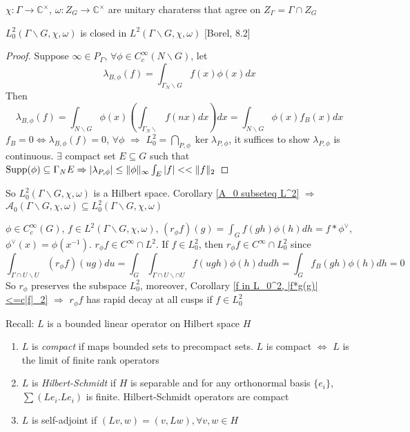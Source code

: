 \documentclass[../main.tex]{subfiles}
\begin{document}
$\chi:\Gamma\to\mathbb C^\times$, $\omega:Z_G\to\mathbb C^\times$ are unitary charaterss that agree on $Z_\Gamma=\Gamma\cap Z_G$

\begin{proposition}
$L_0^2(\Gamma\backslash G,\chi,\omega)$ is closed in $L^2(\Gamma\backslash G,\chi,\omega)$ [Borel, 8.2]
\end{proposition}

\begin{proof}
Suppose $\infty\in P_\Gamma$, $\forall \phi\in C_c^\infty(N\backslash G)$, let
\[\lambda_{B,\phi}(f)=\int_{\Gamma_N\backslash G}f(x)\phi(x)dx\]
Then
\[\lambda_{B,\phi}(f)=\int_{N\backslash G}\phi(x)\left(\int_{\Gamma_N\backslash} f(nx)dx\right)dx=\int_{N\backslash G}\phi(x)f_B(x)dx\]
$f_B=0\iff\lambda_{B,\phi}(f)=0$, $\forall\phi$ $\Rightarrow$ $L_0^2=\bigcap_{P,\phi}\ker\lambda_{P,\phi}$, it suffices to show $\lambda_{P,\phi}$ is continuous. $\exists$ compact set $E\subseteq G$ such that $\operatorname{Supp}(\phi)\subseteq\Gamma_NE\Rightarrow |\lambda_{P,\phi}|\leq\|\phi\|_\infty\int_E|f|<<\|f\|_2$
\end{proof}

So $L_0^2(\Gamma\backslash G,\chi,\omega)$ is a Hilbert space. Corollary \ref{A_0 subseteq L^2} $\Rightarrow$ $\mathcal A_0(\Gamma\backslash G,\chi,\omega)\subseteq L_0^2(\Gamma\backslash G,\chi,\omega)$

\begin{definition}
$\phi\in C^\infty_c(G)$, $f\in L^2(\Gamma\backslash G,\chi,\omega)$, $(r_\phi f)(g)=\int_Gf(gh)\phi(h)dh=f*\phi^\vee$, $\phi^\vee(x)=\phi(x^{-1})$. $r_\phi f\in C^\infty\cap L^2$. If $f\in L^2_0$, then $r_\phi f\in C^\infty\cap L_0^2$ since
\[\int_{\Gamma\cap U\backslash U}(r_\phi f)(ug)du=\int_G\int_{\Gamma\cap U\backslash\cap U}f(ugh)\phi(h)dudh=\int_Gf_B(gh)\phi(h)dh=0\]
So $r_\phi$ preserves the subspace $L^2_0$, moreover, Corollary \ref{f in L_0^2, |f*g(g)|<=c|f|_2} $\Rightarrow$ $r_\phi f$ has rapid decay at all cusps if $f\in L_0^2$
\end{definition}

Recall: $L$ is a bounded linear operator on Hilbert space $H$
\begin{enumerate}
\item $L$ is \textit{compact} if maps bounded sets to precompact sets. $L$ is compact $\iff$ $L$ is the limit of finite rank operators
\item $L$ is \textit{Hilbert-Schmidt} if $H$ is separable and for any orthonormal basis $\{e_i\}$, $\sum(Le_i.Le_i)$ is finite. Hilbert-Schmidt operators are compact
\item $L$ is self-adjoint if $(Lv,w)=(v,Lw),\forall v,w\in H$
\end{enumerate}
\end{document}
